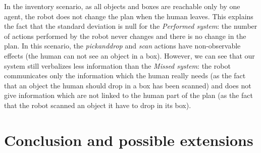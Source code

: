 \documentclass[english,a4paper,11pt,twoside]{StyleThese}
\begin{document}
In the inventory scenario, as all objects and boxes are reachable only by one agent, the robot does not change the plan when the human leaves. This explains the fact that the standard deviation is null for the \textit{Performed system}: the number of actions performed by the robot never changes and there is no change in the plan. In this scenario, the \textit{pickanddrop} and \textit{scan} actions have non-observable effects (the human can not see an object in a box). However, we can see that our system still verbalizes less information than the \textit{Missed system}: the robot communicates only the information which the human really needs (as the fact that an object the human should drop in a box has been scanned) and does not give information which are not linked to the human part of the plan (as the fact that the robot scanned an object it have to drop in its box).


\section{Conclusion and possible extensions}



\ifdefined{}
\else


\end{document}
